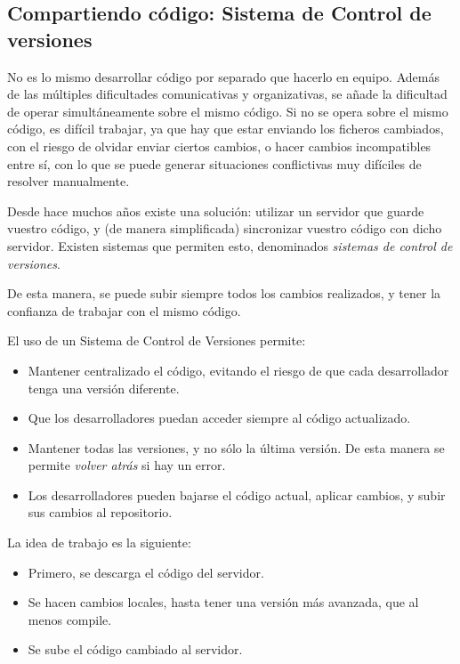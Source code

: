\documentclass[11pt]{article}
\begin{document}
\subsection{Compartiendo código: Sistema de Control de versiones}
\label{sec-7-2} \label{scv}

No es lo mismo desarrollar código por separado que hacerlo en equipo. Además de las múltiples dificultades
comunicativas y organizativas, se añade la dificultad de operar simultáneamente sobre el mismo
código. Si no se opera sobre el mismo código, es difícil trabajar, ya que hay que
estar enviando los ficheros cambiados, con el riesgo de olvidar enviar ciertos cambios, o hacer cambios incompatibles entre sí, con lo que se puede generar situaciones conflictivas muy difíciles de resolver manualmente.

Desde hace muchos años existe una solución: utilizar un servidor
que guarde vuestro código, y (de manera simplificada) sincronizar vuestro código con dicho servidor.
Existen sistemas que permiten esto, denominados \emph{sistemas de control de
versiones}.

De esta manera, se puede subir siempre todos los cambios realizados, y tener la
confianza de trabajar con el mismo código.

El uso de un Sistema de Control de Versiones permite: 


\begin{itemize}

\item Mantener centralizado el código, evitando el riesgo de que
cada desarrollador tenga una versión diferente. 

\item Que los desarrolladores
puedan acceder siempre al código actualizado. 

\item Mantener todas las
versiones, y no sólo la última versión. De esta manera se permite \emph{volver
atrás} si hay un error. 

\item Los desarrolladores pueden bajarse el código
actual, aplicar cambios, y subir sus cambios al repositorio. 

\end{itemize}


La idea de trabajo es la siguiente:


\begin{itemize} 

\item Primero, se descarga el código del servidor. 

\item Se
hacen cambios locales, hasta tener una versión más avanzada, que al menos
compile. 

\item Se sube el código cambiado al servidor. 

\end{itemize}
\end{document}
